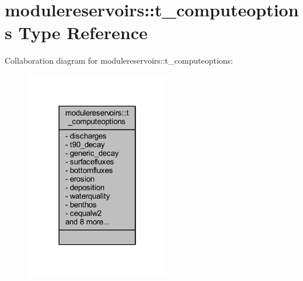 \hypertarget{structmodulereservoirs_1_1t__computeoptions}{}\section{modulereservoirs\+:\+:t\+\_\+computeoptions Type Reference}
\label{structmodulereservoirs_1_1t__computeoptions}


Collaboration diagram for modulereservoirs\+:\+:t\+\_\+computeoptions\+:\nopagebreak
\begin{figure}[H]
\begin{center}
\leavevmode
\includegraphics[width=178pt]{structmodulereservoirs_1_1t__computeoptions__coll__graph}
\end{center}
\end{figure}
